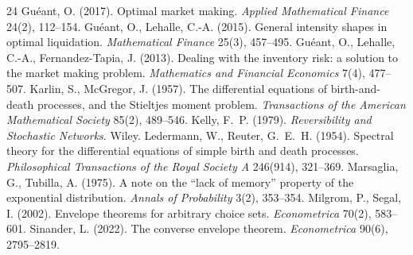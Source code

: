 \documentclass[11pt]{article}
\begin{document}
\begin{thebibliography}{24}
 Gu\'eant, O. (2017). Optimal market making. \emph{Applied Mathematical Finance} 24(2), 112--154.
 Gu\'eant, O., Lehalle, C.-A. (2015). General intensity shapes in optimal liquidation. \emph{Mathematical Finance} 25(3), 457--495.
 Gu\'eant, O., Lehalle, C.-A., Fernandez-Tapia, J. (2013). Dealing with the inventory risk: a solution to the market making problem. \emph{Mathematics and Financial Economics} 7(4), 477--507.
 Karlin, S., McGregor, J. (1957). The differential equations of birth-and-death processes, and the Stieltjes moment problem. \emph{Transactions of the American Mathematical Society} 85(2), 489--546.
 Kelly, F.~P. (1979). \emph{Reversibility and Stochastic Networks}. Wiley.
 Ledermann, W., Reuter, G.~E.~H. (1954). Spectral theory for the differential equations of simple birth and death processes. \emph{Philosophical Transactions of the Royal Society A} 246(914), 321--369.
 Marsaglia, G., Tubilla, A. (1975). A note on the ``lack of memory'' property of the exponential distribution. \emph{Annals of Probability} 3(2), 353--354.
 Milgrom, P., Segal, I. (2002). Envelope theorems for arbitrary choice sets. \emph{Econometrica} 70(2), 583--601.
 Sinander, L. (2022). The converse envelope theorem. \emph{Econometrica} 90(6), 2795--2819.
\end{thebibliography}
\end{document}
